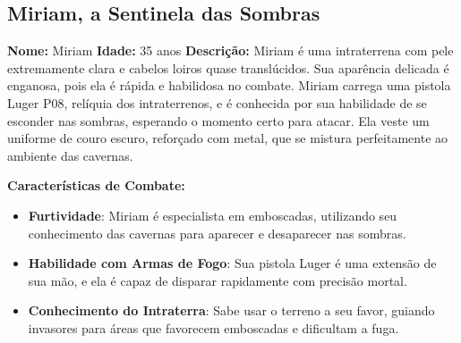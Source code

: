 \begin{personagem}
    
\subsection{Miriam, a Sentinela das Sombras}

\textbf{Nome:} Miriam  
\textbf{Idade:} 35 anos  
\textbf{Descrição:}  
Miriam é uma intraterrena com pele extremamente clara e cabelos loiros quase translúcidos. Sua aparência delicada é enganosa, pois ela é rápida e habilidosa no combate. Miriam carrega uma pistola Luger P08, relíquia dos intraterrenos, e é conhecida por sua habilidade de se esconder nas sombras, esperando o momento certo para atacar. Ela veste um uniforme de couro escuro, reforçado com metal, que se mistura perfeitamente ao ambiente das cavernas.

\textbf{Características de Combate:}
\begin{itemize}
    \item \textbf{Furtividade}: Miriam é especialista em emboscadas, utilizando seu conhecimento das cavernas para aparecer e desaparecer nas sombras.
    \item \textbf{Habilidade com Armas de Fogo}: Sua pistola Luger é uma extensão de sua mão, e ela é capaz de disparar rapidamente com precisão mortal.
    \item \textbf{Conhecimento do Intraterra}: Sabe usar o terreno a seu favor, guiando invasores para áreas que favorecem emboscadas e dificultam a fuga.
\end{itemize}
\end{personagem}
